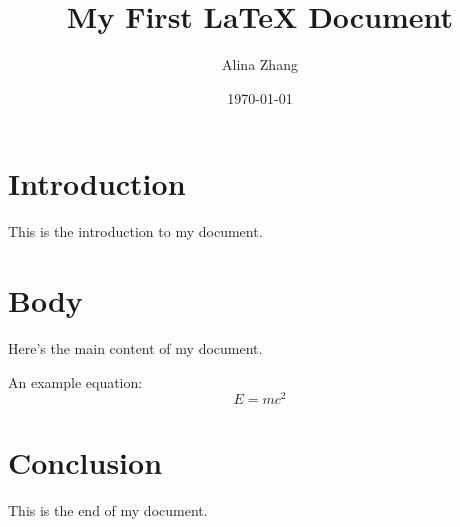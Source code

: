\documentclass[12pt]{article}
\title{My First LaTeX Document}
\author{Alina Zhang}
\date{\today}           %
\begin{document}
\maketitle              %

\section{Introduction}
This is the introduction to my document.

\section{Body}
Here's the main content of my document. 

An example equation:
\begin{equation}
    E = mc^2
\end{equation}

\section{Conclusion}
This is the end of my document.
\end{document}
